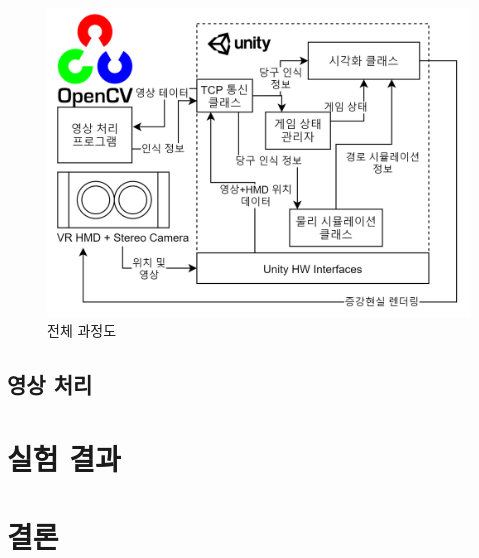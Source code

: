 \documentclass[10pt]{oblivoir}
\begin{document}
\begin{figure}
    \centering
    \includegraphics[width=16cm]{img/overall-process.png}
    \caption{전체 과정도}
    \label{fig;overall-proc}
\end{figure}

\subsection{영상 처리}





\section{실험 결과}



\section{결론}



\end{document}
